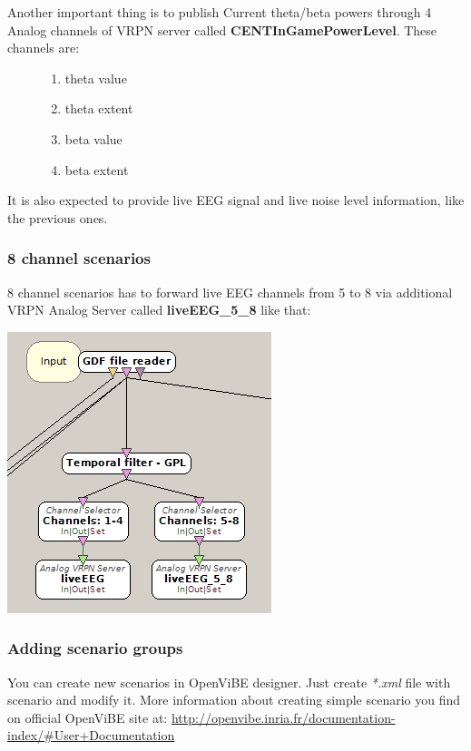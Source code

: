 \documentclass[letterpaper,10pt,english]{sphinxmanual}
\begin{document}
\begin{description}
\item[{Another important thing is to publish Current theta/beta powers through 4 Analog channels of VRPN server called \textbf{CENTInGamePowerLevel}. These channels are:}] \leavevmode\begin{enumerate}
\item {} 
theta value

\item {} 
theta extent

\item {} 
beta value

\item {} 
beta extent

\end{enumerate}

\end{description}

It is also expected to provide live EEG signal and live noise level information, like the previous ones.


\subsubsection{8 channel scenarios}
\label{index:channel-scenarios}
8 channel scenarios has to forward live EEG channels from 5 to 8 via additional VRPN Analog Server called \textbf{liveEEG\_5\_8} like that:

\includegraphics{LiveEEGWith8Channels.png}


\subsubsection{Adding scenario groups}
\label{index:adding-scenario-groups}
You can create new scenarios in OpenViBE designer. Just create \emph{*.xml} file with scenario and modify it. More information about creating simple scenario you find on official OpenViBE site at: \href{http://openvibe.inria.fr/documentation-index/\#User+Documentation}{http://openvibe.inria.fr/documentation-index/\#User+Documentation}
\end{document}
